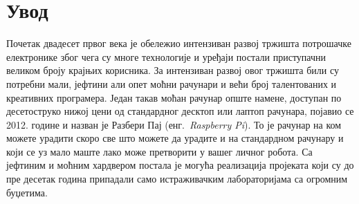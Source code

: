 \documentclass[12pt,oneside]{memoir}
\theoremstyle{remark}
\begin{document}
\frontmatter
\naslovna
\komisija
\apstrakt
\tableofcontents*

\mainmatter

\chapter{Увод}
\label{chp:uvod}
Почетак двадесет првог века је обележио интензиван развој тржишта потрошачке електронике због чега су многе технологије и уређаји постали приступачни великом броју крајњих корисника. За интензиван развој овог тржишта били су потребни мали, јефтини али опет моћни рачунари и већи број талентованих и креативних програмера. Један такав моћан рачунар опште намене, доступан по десетоструко нижој цени од стандардног десктоп или лаптоп рачунара, појавио се 2012. године и назван је Разбери Пај (енг.~{\em Raspberry Pi}). То је рачунар на ком можете урадити скоро све што можете да урадите и на стандардном рачунару и који се уз мало маште лако може претворити у вашег личног робота. Са јефтиним и моћним хардвером постала је могућа реализација пројеката који су до пре десетак година припадали само истраживачким лабораторијама са огромним буџетима.
\end{document}
